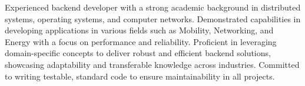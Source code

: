 \par{
    Experienced backend developer with a strong academic background in distributed systems, operating systems, and computer networks. Demonstrated capabilities in developing applications in various fields such as Mobility, Networking, and Energy with a focus on performance and reliability. Proficient in leveraging domain-specific concepts to deliver robust and efficient backend solutions, showcasing adaptability and transferable knowledge across industries. Committed to writing testable, standard code to ensure maintainability in all projects.
}